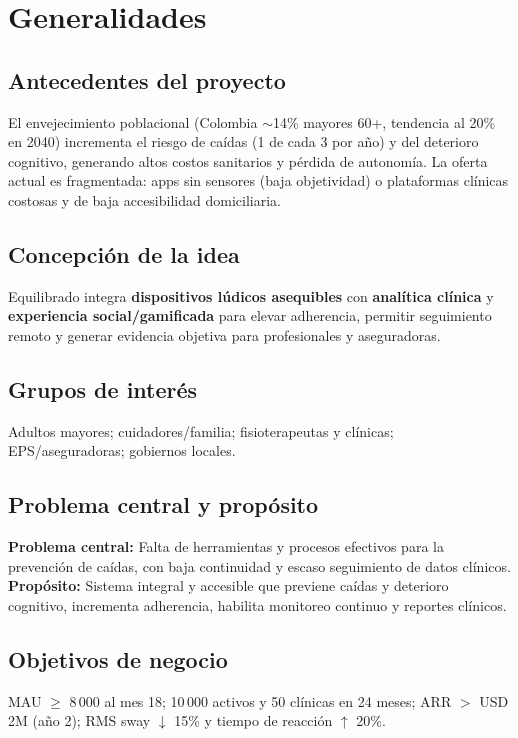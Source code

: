 \section{Generalidades}
\subsection{Antecedentes del proyecto}
El envejecimiento poblacional (Colombia $\sim$14\% mayores 60+, tendencia al 20\% en 2040) incrementa el riesgo de caídas (1 de cada 3 por año) y del deterioro cognitivo, generando altos costos sanitarios y pérdida de autonomía. La oferta actual es fragmentada: apps sin sensores (baja objetividad) o plataformas clínicas costosas y de baja accesibilidad domiciliaria.

\subsection{Concepción de la idea}
Equilibrado integra \textbf{dispositivos lúdicos asequibles} con \textbf{analítica clínica} y \textbf{experiencia social/gamificada} para elevar adherencia, permitir seguimiento remoto y generar evidencia objetiva para profesionales y aseguradoras.

\subsection{Grupos de interés}
Adultos mayores; cuidadores/familia; fisioterapeutas y clínicas; EPS/aseguradoras; gobiernos locales. 

\subsection{Problema central y propósito}
\textbf{Problema central:} Falta de herramientas y procesos efectivos para la prevención de caídas, con baja continuidad y escaso seguimiento de datos clínicos.\\
\textbf{Propósito:} Sistema integral y accesible que previene caídas y deterioro cognitivo, incrementa adherencia, habilita monitoreo continuo y reportes clínicos.

\subsection{Objetivos de negocio}
MAU $\geq$ 8\,000 al mes 18; 10\,000 activos y 50 clínicas en 24 meses; ARR $>$ USD 2M (año 2); RMS sway $\downarrow$ 15\% y tiempo de reacción $\uparrow$ 20\%.

